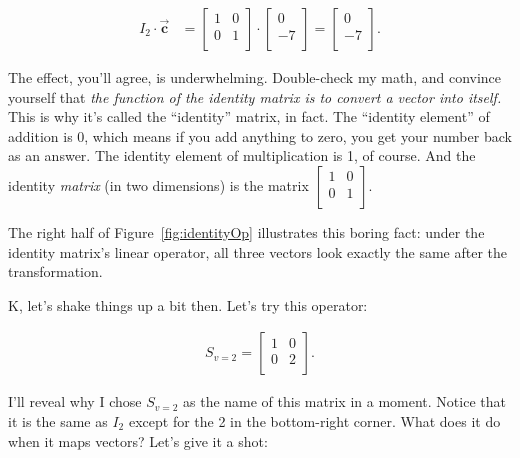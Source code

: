 \vspace{-.15in}
\begin{align*}
I_2 \cdot \overrightarrow{\textbf{c}} &=
\begin{bmatrix}
1 & 0 \\
0 & 1 \\
\end{bmatrix} \cdot
\begin{bmatrix}
0 \\ -7 \\
\end{bmatrix} =
\begin{bmatrix}
0 \\ -7 \\
\end{bmatrix}.
\end{align*}
\vspace{-.15in}

The effect, you'll agree, is underwhelming. Double-check my math, and convince
yourself that \textit{the function of the identity matrix is to convert a
vector into itself.} This is why it's called the ``identity'' matrix, in fact.
The ``identity element'' of addition is 0, which means if you add anything to
zero, you get your number back as an answer. The identity element of
multiplication is 1, of course. And the identity \textit{matrix} (in two
dimensions) is the matrix {\tiny $\begin{bmatrix} 1 & 0 \\ 0 & 1 \\
\end{bmatrix}$}.

The right half of Figure~\ref{fig:identityOp} illustrates this boring fact:
under the identity matrix's linear operator, all three vectors look exactly the
same after the transformation.

\medskip

K, let's shake things up a bit then. Let's try this operator:

\vspace{-.15in}
\begin{align*}
S_{v=2} =
\begin{bmatrix}
1 & 0 \\
0 & 2 \\
\end{bmatrix}.
\end{align*}
\vspace{-.15in}

I'll reveal why I chose $S_{v=2}$ as the name of this matrix in a moment.
Notice that it is the same as $I_2$ except for the 2 in the bottom-right
corner. What does it do when it maps vectors? Let's give it a shot:

